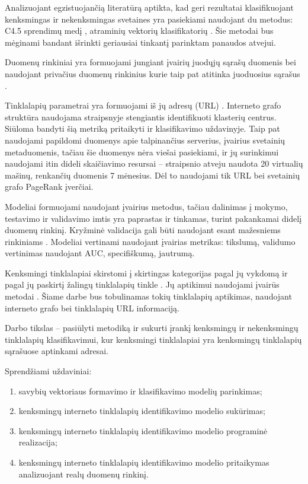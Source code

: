 Analizuojant egzistuojančią literatūrą aptikta, kad geri rezultatai klasifikuojant kenksmingas ir nekenksmingas svetaines yra pasiekiami naudojant du metodus: C4.5 sprendimų medį \cite{trees}, atraminių vektorių klasifikatorių \cite{comp}. Šie metodai bus mėginami bandant išrinkti geriausiai tinkantį parinktam panaudos atvejui.

Duomenų rinkiniai yra formuojami jungiant įvairių juodųjų sąrašų duomenis bei naudojant privačius duomenų rinkinius kurie taip pat atitinka juoduosius sąrašus \cite{trees, comp, webcop}.

Tinklalapių parametrai yra formuojami iš jų adresų (URL) \cite{trees, comp}. Interneto grafo struktūra naudojama straipsnyje \cite{linchpins} stengiantis identifikuoti klasterių centrus. Siūloma bandyti šią metriką pritaikyti ir klasifikavimo uždavinyje. Taip pat naudojami papildomi duomenys apie talpinančius serverius, įvairius svetainių metaduomenis, tačiau šie duomenys nėra viešai pasiekiami, ir jų surinkimui naudojami itin dideli skaičiavimo resursai -- \cite{linchpins} straipsnio atveju naudota 20 virtualių mašinų, renkančių duomenis 7 mėnesius. Dėl to naudojami tik URL bei svetainių grafo PageRank įverčiai.

Modeliai formuojami naudojant įvairius metodus, tačiau dalinimas į mokymo, testavimo ir validavimo imtis yra paprastas ir tinkamas, turint pakankamai didelį duomenų rinkinį. Kryžminė validacija gali būti naudojant esant mažesniems rinkiniams \cite{trees}. Modeliai vertinami naudojant įvairias metrikas: tikslumą, validumo vertinimas naudojant AUC, specifiškumą, jautrumą.

\newpage
{}
Kenksmingi tinklalapiai skirstomi į skirtingas kategorijas pagal jų vykdomą \cite{tax} ir pagal jų paskirtį žalingų tinklalapių tinkle \cite{linchpins}. Jų aptikimui naudojami įvairūs metodai \cite{comp}. Šiame darbe bus tobulinamas tokių tinklalapių aptikimas, naudojant interneto grafo bei tinklalapių URL informaciją.

Darbo tikslas -- pasiūlyti metodiką ir sukurti įrankį kenksmingų ir nekenksmingų tinklalapių klasifikavimui, kur kenksmingi tinklalapiai yra kenksmingų tinklalapių sąrašuose aptinkami adresai.

Sprendžiami uždaviniai:
\begin{enumerate}
    \item savybių vektoriaus formavimo ir klasifikavimo modelių parinkimas;
    \item kenksmingų interneto tinklalapių identifikavimo modelio sukūrimas;
    \item kenksmingų interneto tinklalapių identifikavimo modelio programinė realizacija;
    \item kenksmingų interneto tinklalapių identifikavimo modelio pritaikymas analizuojant realų duomenų rinkinį.
\end{enumerate}
